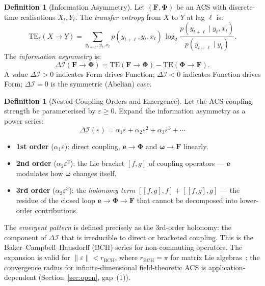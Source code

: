 \documentclass[11pt,a4paper]{article}
\theoremstyle{plain}
\theoremstyle{definition}
\newtheorem{definition}[theorem]{Definition}
\theoremstyle{remark}
\newcommand{\DI}{\Delta\mathcal{I}}
\newcommand{\eps}{\varepsilon}
\newcommand{\FormF}{\mathbf{F}}
\newcommand{\FuncF}{\boldsymbol{\Phi}}
\providecommand{\Form}{\mathbf{e}}
\providecommand{\Func}{\boldsymbol{\omega}}
\newcommand{\TE}{\mathrm{TE}}
\begin{document}
\begin{definition}[Information Asymmetry]\label{def:DI}
Let $(\FormF, \FuncF)$ be an ACS with discrete-time realisations $X_t, Y_t$.
The \emph{transfer entropy} from $X$ to $Y$ at lag $\ell$ is:
\begin{equation}
  \TE_\ell(X \to Y) = 
  \sum_{y_{t+\ell}, y_t, x_t} 
  p(y_{t+\ell}, y_t, x_t)\,
  \log_2 \frac{p(y_{t+\ell} \mid y_t, x_t)}{p(y_{t+\ell} \mid y_t)}.
\end{equation}
The \emph{information asymmetry} is:
\begin{equation}
  \DI(\FormF \to \FuncF) = \TE(\FormF \to \FuncF) - \TE(\FuncF \to \FormF).
\end{equation}
A value $\DI > 0$ indicates Form drives Function;
$\DI < 0$ indicates Function drives Form;
$\DI = 0$ is the symmetric (Abelian) case.
\end{definition}

\begin{definition}[Nested Coupling Orders and Emergence]\label{def:nested}
Let the ACS coupling strength be parameterised by $\eps \geq 0$.
Expand the information asymmetry as a power series:
\begin{equation}
  \DI(\eps) = \alpha_1 \eps + \alpha_2 \eps^2 + \alpha_3 \eps^3 + \cdots
\end{equation}
\begin{itemize}[noitemsep]
  \item \textbf{1st order} ($\alpha_1 \eps$): direct coupling, $\Form \to \FuncF$ and $\Func \to \FormF$ linearly.
  \item \textbf{2nd order} ($\alpha_2 \eps^2$): the Lie bracket $[f,g]$ of coupling 
    operators --- $\Form$ modulates how $\Func$ changes itself.
  \item \textbf{3rd order} ($\alpha_3 \eps^3$): the \emph{holonomy term} 
    $[[f,g],f] + [[f,g],g]$ --- the residue of the closed loop 
    $\Form \to \FuncF \to \FormF$ that cannot be decomposed into lower-order contributions.
\end{itemize}
The \emph{emergent pattern} is defined precisely as the 3rd-order holonomy: 
the component of $\DI$ that is irreducible to direct or bracketed coupling.
This is the Baker--Campbell--Hausdorff (BCH) series for non-commuting operators.
The expansion is valid for $\|\eps\| < r_{\mathrm{BCH}}$, where
$r_{\mathrm{BCH}} = \pi$ for matrix Lie algebras~\cite{Hall2015};
the convergence radius for infinite-dimensional field-theoretic ACS
is application-dependent (Section~\ref{sec:open}, gap~(1)).
\end{definition}
\end{document}
